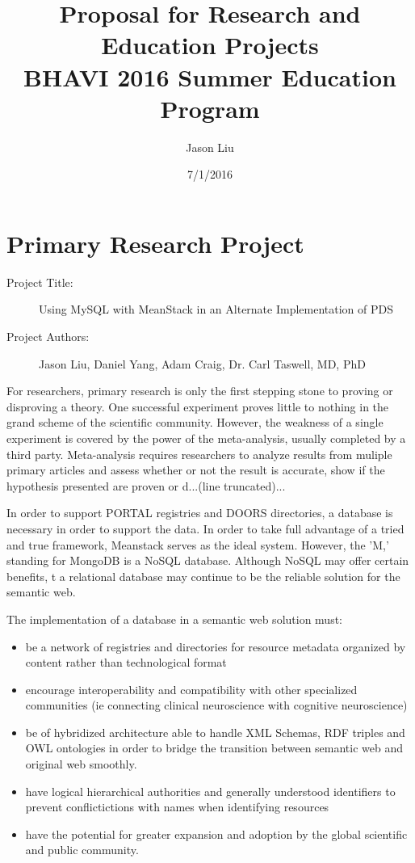 \documentclass[12pt]{article}
\title{Proposal for Research and Education Projects\\
	 BHAVI 2016 Summer Education Program}
\author{Jason Liu}
\date{7/1/2016}
\begin{document}
\maketitle

\section{Primary Research Project}
	\begin{description}
		\item[Project Title:] Using MySQL with MeanStack in an Alternate Implementation of PDS
		\item[Project Authors:] Jason Liu, Daniel Yang, Adam Craig, Dr. Carl Taswell, MD, PhD 
	\end{description}

	For researchers, primary research is only the first stepping stone to proving or disproving a theory. One successful experiment proves little to nothing in the grand scheme of the scientific community. However, the weakness of a single experiment is covered by the power of the meta-analysis, usually completed by a third party. Meta-analysis requires researchers to analyze results from muliple primary articles and assess whether or not the result is accurate, show if the hypothesis presented are proven or d...(line truncated)...

	In order to support PORTAL registries and DOORS directories, a database is necessary in order to support the data. In order to take full advantage of a tried and true framework, Meanstack serves as the ideal system. However, the 'M,' standing for MongoDB is a NoSQL database. Although NoSQL may offer certain benefits, t a relational database may continue to be the reliable solution for the semantic web.  

\hfill

	The implementation of a database in a semantic web solution must:
\begin{itemize}
\item be a network of registries and directories for resource metadata organized by content rather than technological format
\item encourage interoperability and compatibility with other specialized communities (ie connecting clinical neuroscience with cognitive neuroscience)
\item be of hybridized architecture able to handle XML Schemas, RDF triples and OWL ontologies in order to bridge the transition between semantic web and original web smoothly. 
\item have logical hierarchical authorities and generally understood identifiers
to prevent conflictictions with names when identifying resources 
\item have the potential for greater expansion and adoption by the global scientific and public community. 
\end{itemize}
\end{document}
